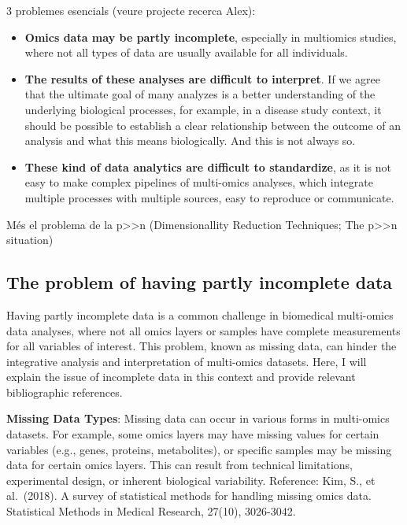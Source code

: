 \documentclass[a4paper, nobind]{templates/ociamthesis}
\begin{document}
3 problemes esencials (veure projecte recerca Alex):

\begin{itemize}
\item
  \textbf{Omics data may be partly incomplete}, especially in multiomics studies, where not all types of data are usually available for all individuals.
\item
  \textbf{The results of these analyses are difficult to interpret}. If we agree that the ultimate goal of many analyzes is a better understanding of the underlying biological processes, for example, in a disease study context, it should be possible to establish a clear relationship between the outcome of an analysis and what this means biologically. And this is not always so.
\item
  \textbf{These kind of data analytics are difficult to standardize}, as it is not easy to make complex pipelines of multi-omics analyses, which integrate multiple processes with multiple sources, easy to reproduce or communicate.
\end{itemize}

Més el problema de la p\textgreater\textgreater n (Dimensionallity Reduction Techniques; The p\textgreater\textgreater n situation)

\hypertarget{the-problem-of-having-partly-incomplete-data}{%
\subsection{The problem of having partly incomplete data}\label{the-problem-of-having-partly-incomplete-data}}

Having partly incomplete data is a common challenge in biomedical multi-omics data analyses, where not all omics layers or samples have complete measurements for all variables of interest. This problem, known as missing data, can hinder the integrative analysis and interpretation of multi-omics datasets. Here, I will explain the issue of incomplete data in this context and provide relevant bibliographic references.

\textbf{Missing Data Types}: Missing data can occur in various forms in multi-omics datasets. For example, some omics layers may have missing values for certain variables (e.g., genes, proteins, metabolites), or specific samples may be missing data for certain omics layers. This can result from technical limitations, experimental design, or inherent biological variability. Reference: Kim, S., et al.~(2018). A survey of statistical methods for handling missing omics data. Statistical Methods in Medical Research, 27(10), 3026-3042.
\end{document}

